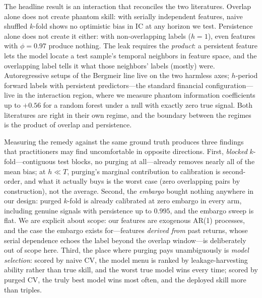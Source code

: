 \documentclass[11pt]{article}
\begin{document}
The headline result is an interaction that reconciles the two literatures.
Overlap alone does not create phantom skill: with serially independent
features, naive shuffled $k$-fold shows no optimistic bias in IC at any
horizon we test.
Persistence alone does not create it either: with non-overlapping labels
($h=1$), even features with $\phi=0.97$ produce nothing. The leak requires
the \emph{product}: a persistent feature lets the model locate a test
sample's temporal neighbors in feature space, and the overlapping label tells
it what those neighbors' labels (mostly) were. Autoregressive setups of the
Bergmeir line live on the two harmless axes; $h$-period forward labels with
persistent predictors---the standard financial configuration---live in the
interaction region, where we measure phantom information coefficients up to
$+0.56$ for a random forest under a null with exactly zero true signal. Both
literatures are right in their own regime, and the boundary between the
regimes is the product of overlap and persistence.

Measuring the remedy against the same ground truth produces three findings
that practitioners may find uncomfortable in opposite directions. First,
\emph{blocked} $k$-fold---contiguous test blocks, no purging at all---already
removes nearly all of the mean bias; at $h \ll T$, purging's marginal
contribution to calibration is second-order, and what it actually buys is the
worst case (zero overlapping pairs by construction), not the average. Second,
the \emph{embargo} bought nothing anywhere in our design: purged $k$-fold is
already calibrated at zero embargo in every arm, including genuine signals
with persistence up to $0.995$, and the embargo sweep is flat. We are explicit
about scope: our features are exogenous AR(1) processes, and the case the
embargo exists for---features \emph{derived from} past returns, whose serial
dependence echoes the label beyond the overlap window---is deliberately out of
scope here. Third, the place where purging pays unambiguously is
\emph{model selection}: scored by naive CV, the model menu is ranked by
leakage-harvesting ability rather than true skill, and the worst true model
wins every time; scored by purged CV, the truly best model wins most often,
and the deployed skill more than triples.
\end{document}
